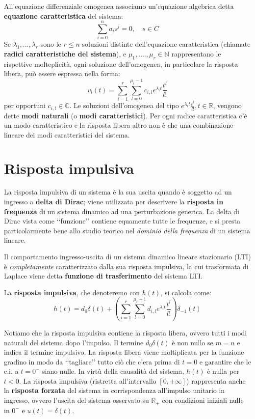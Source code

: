 \documentclass[a4paper, titlepage, oneside]{scrbook}
\begin{document}
All'equazione differenziale omogenea associamo un’equazione algebrica detta \textbf{equazione caratteristica} del sistema:
\begin{equation*}
	\sum_{i=0}^{n}a_is^i=0, \quad s \in C
\end{equation*}
Se $\lambda_1,...,\lambda_r$ sono le $r\leq n$ soluzioni distinte dell'equazione caratteristica (chiamate \textbf{radici caratteristiche del sistema}),
e $\mu_1,....,\mu_r \in \mathbb{N}$ rappresentano le rispettive molteplicità, ogni soluzione dell'omogenea, in particolare la risposta libera, può essere espressa nella forma:
\begin{equation}
	v_l(t)=\sum_{i=1}^{r}\sum_{l=0}^{\mu_i-1}c_{i,l}e^{\lambda_it}\frac{t^l}{l!}
	\label{eqn:risposta_libera}
\end{equation}
per opportuni $c_{i,l} \in \mathbb{C}$. Le soluzioni dell'omogenea del tipo $e^{\lambda_it}\frac{t^l}{l!}, t \in \mathbb{R}$, vengono dette \textbf{modi naturali}
(o \textbf{modi caratteristici}). Per ogni radice caratteristica c'è un modo caratteristico e la risposta libera altro non è che una combinazione lineare dei modi caratteristici del sistema.

\section{Risposta impulsiva}
La risposta impulsiva di un sistema è la sua uscita quando è soggetto ad un ingresso a \textbf{delta di Dirac};
viene utilizzata per descrivere la \textbf{risposta in frequenza} di un sistema dinamico ad una perturbazione generica.
La delta di Dirac vista come ‘‘funzione’’ contiene equamente tutte le frequenze, e si presta particolarmente bene allo studio teorico nel \textit{dominio della frequenza} di un sistema lineare.

Il comportamento ingresso-uscita di un sistema dinamico lineare stazionario (LTI) è \textit{completamente} caratterizzato dalla sua risposta impulsiva, la cui trasformata di Laplace viene detta \textbf{funzione di trasferimento} del sistema LTI.

La \textbf{risposta impulsiva}, che denoteremo con $h(t)$, si calcola come:
\begin{equation}
h(t)=d_0\delta(t)+\left(\sum_{i=1}^{r} \sum_{l=0}^{\mu_i-1} d_{i,l}e^{\lambda_it}\frac{t^l}{l!}\right)\delta_{-1}(t)
\label{eqn:risposta_impulsiva}
\end{equation}

Notiamo che la risposta impulsiva contiene la risposta libera, ovvero tutti i modi naturali del sistema dopo l'impulso. Il termine $d_0\delta(t)$ è non nullo se $m=n$ e indica il termine impulsivo.
La risposta libera viene moltiplicata per la funzione gradino in modo da ‘‘tagliare’’ tutto ciò che c'era prima di $t=0$ e garantire che le c.i. a $t=0^-$ siano nulle.
In virtù della causalità del sistema, $h(t)$ è nulla per $t<0$. La risposta impulsiva (ristretta all'intervallo $[0,+\infty]$) rappresenta anche la \textbf{risposta forzata}
del sistema in corrispondenza all'impulso unitario in ingresso, ovvero l'uscita del sistema osservato su $\mathbb{R}_+$ con condizioni iniziali nulle in $0^-$ e $u(t)=\delta(t)$.
\end{document}
